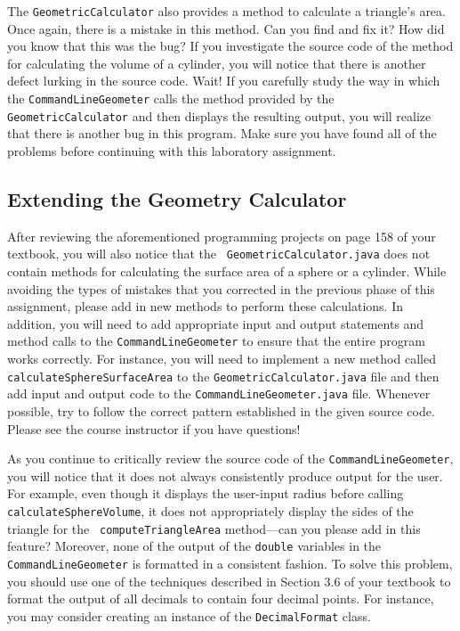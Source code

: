 The {\tt GeometricCalculator} also provides a method to calculate a triangle's area.  Once again, there is a
mistake in this method.  Can you find and fix it? How did you know that this was the bug? If you investigate the source
code of the method for calculating the volume of a cylinder, you will notice that there is another defect lurking in the
source code. Wait! If you carefully study the way in which the {\tt CommandLineGeometer} calls the method
provided by the {\tt GeometricCalculator} and then displays the resulting output, you will realize that there is another
bug in this program. Make sure you have found all of the problems before continuing with this laboratory assignment.

\vspace*{-.1in}
\subsection*{Extending the Geometry Calculator}
\vspace*{-.05in}

\begin{sloppypar}
  After reviewing the aforementioned programming projects on page 158 of your textbook, you will also notice that the {\tt
  GeometricCalculator.java} does not contain methods for calculating the surface area of a sphere or a cylinder.  While
  avoiding the types of mistakes that you corrected in the previous phase of this assignment, please add in new methods
  to perform these calculations. In addition, you will need to add appropriate input and output statements and method
  calls to the {\tt CommandLineGeometer} to ensure that the entire program works correctly. For instance, you will need to
  implement a new method called {\tt calculateSphereSurfaceArea} to the {\tt GeometricCalculator.java} file and then add
  input and output code to the {\tt CommandLineGeometer.java} file. Whenever possible, try to follow the correct
  pattern established in the given source code. Please see the course instructor if you have questions!
\end{sloppypar}

As you continue to critically review the source code of the {\tt CommandLineGeometer}, you will notice that it does not
always consistently produce output for the user.  For example, even though it displays the user-input radius before
calling {\tt calculateSphereVolume}, it does not appropriately display the sides of the triangle for the {\tt
computeTriangleArea} method---can you please add in this feature? Moreover, none of the output of the {\tt double}
variables in the {\tt CommandLineGeometer} is formatted in a consistent fashion. To solve this problem, you should use
one of the techniques described in Section 3.6 of your textbook to format the output of all decimals to contain four
decimal points. For instance, you may consider creating an instance of the {\tt DecimalFormat} class.

